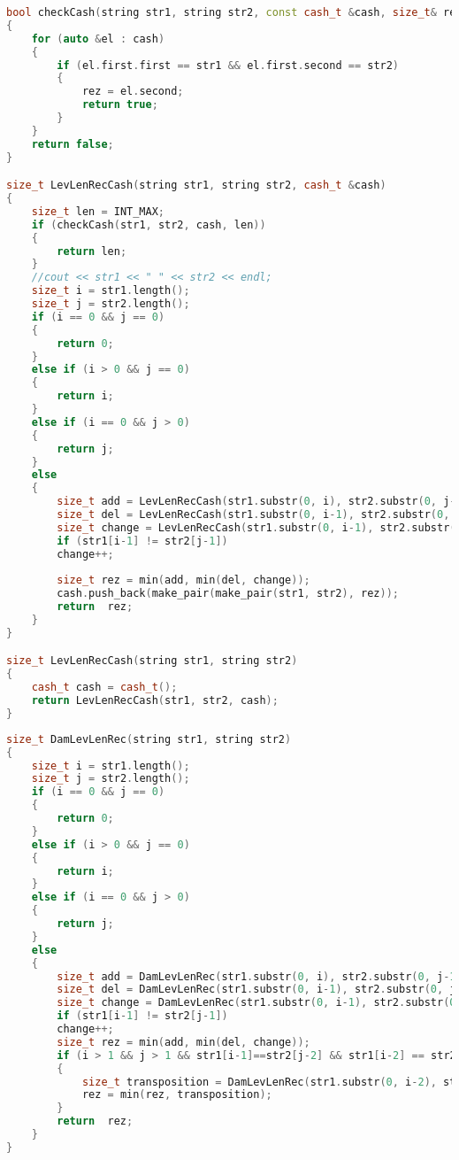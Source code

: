 \begin{lstlisting}[language=c++, caption=Реализация алгоритма Левенштейна с рекурсией и кэшированием]
bool checkCash(string str1, string str2, const cash_t &cash, size_t& rez)
{
	for (auto &el : cash)
	{
		if (el.first.first == str1 && el.first.second == str2)
		{
			rez = el.second;
			return true;
		}
	}
	return false;
}

size_t LevLenRecCash(string str1, string str2, cash_t &cash)
{
	size_t len = INT_MAX;
	if (checkCash(str1, str2, cash, len))
	{
		return len;
	}
	//cout << str1 << " " << str2 << endl;
	size_t i = str1.length();
	size_t j = str2.length();
	if (i == 0 && j == 0)
	{
		return 0;
	}
	else if (i > 0 && j == 0)
	{
		return i;
	}
	else if (i == 0 && j > 0)
	{
		return j;
	}
	else
	{
		size_t add = LevLenRecCash(str1.substr(0, i), str2.substr(0, j-1), cash) + 1;
		size_t del = LevLenRecCash(str1.substr(0, i-1), str2.substr(0, j), cash) + 1;
		size_t change = LevLenRecCash(str1.substr(0, i-1), str2.substr(0, j-1), cash);
		if (str1[i-1] != str2[j-1])
		change++;
		
		size_t rez = min(add, min(del, change));
		cash.push_back(make_pair(make_pair(str1, str2), rez));
		return  rez;
	}
}

size_t LevLenRecCash(string str1, string str2)
{
	cash_t cash = cash_t();
	return LevLenRecCash(str1, str2, cash);
}
\end{lstlisting}


\begin{lstlisting}[language=c++, caption=Реализация алгоритма Дамеру-Левенштейна рекурсивным способом]
size_t DamLevLenRec(string str1, string str2)
{
	size_t i = str1.length();
	size_t j = str2.length();
	if (i == 0 && j == 0)
	{
		return 0;
	}
	else if (i > 0 && j == 0)
	{
		return i;
	}
	else if (i == 0 && j > 0)
	{
		return j;
	}
	else
	{
		size_t add = DamLevLenRec(str1.substr(0, i), str2.substr(0, j-1)) + 1;
		size_t del = DamLevLenRec(str1.substr(0, i-1), str2.substr(0, j)) + 1;
		size_t change = DamLevLenRec(str1.substr(0, i-1), str2.substr(0, j-1));
		if (str1[i-1] != str2[j-1])
		change++;
		size_t rez = min(add, min(del, change));
		if (i > 1 && j > 1 && str1[i-1]==str2[j-2] && str1[i-2] == str2[j-1])
		{
			size_t transposition = DamLevLenRec(str1.substr(0, i-2), str2.substr(0, j-2)) + 1;
			rez = min(rez, transposition);
		}
		return  rez;
	}
}
\end{lstlisting}
